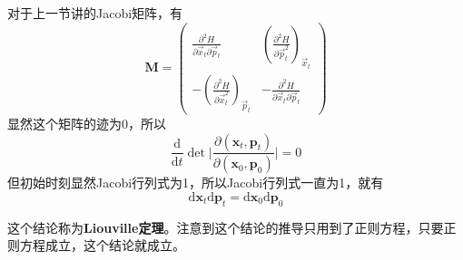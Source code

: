 \documentclass[12pt]{article}
\begin{document}
    对于上一节讲的Jacobi矩阵，有
    \begin{equation*}
        \bm{M} = 
        \begin{pmatrix}
        \frac {\partial^2 H}{\partial \vec{x}_t \partial \vec{p}_t} & (\frac {\partial^2 H}{\partial \vec{p}_t^2})_{\vec{x}_t}\\
        -(\frac {\partial^2 H}{\partial \vec{x}_t^2})_{\vec{p}_t} & - \frac {\partial^2 H}{\partial \vec{x}_t \partial \vec{p}_t}
        \end{pmatrix}
    \end{equation*}
    显然这个矩阵的迹为0，所以
    \begin{equation*}
        \frac {\mathrm{d}}{\mathrm{d}t} \det \bigg|\frac {\partial (\bm{x}_t,\bm{p}_t)}{\partial (\bm{x}_0,\bm{p}_0)} \bigg| = 0
    \end{equation*}
    但初始时刻显然Jacobi行列式为1，所以Jacobi行列式一直为1，就有
    \begin{equation*}
        \mathrm{d}\bm{x}_t \mathrm{d}\bm{p}_t = \mathrm{d}\bm{x}_0 \mathrm{d}\bm{p}_0
    \end{equation*}

    这个结论称为\textbf{Liouville定理}。注意到这个结论的推导只用到了正则方程，只要正则方程成立，这个结论就成立。
\end{document}
